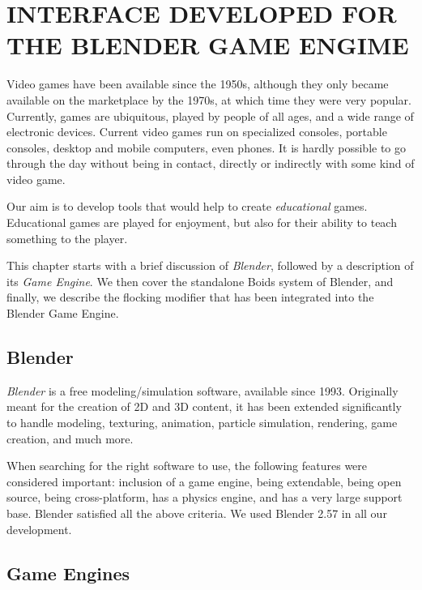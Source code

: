 \chapter{INTERFACE DEVELOPED FOR THE BLENDER GAME ENGIME}\label{chap5}


Video games have been available since the 1950s\cite{historyVideoGames}, although they only  became available on the marketplace by the 1970s, at which time they were very popular. Currently, games are ubiquitous, played by people of all ages, and a wide range of electronic devices. Current video games run on specialized consoles, portable consoles, desktop and mobile computers, even phones. It is hardly possible to go through the day without being in contact, directly or indirectly with some kind of video game.

Our aim is to develop tools that would help to create \textit{educational} games. Educational games are played for enjoyment, but also for their ability to teach something to the player. 

This chapter starts with a brief discussion of \textit{Blender}, followed by a description of its \textit{Game Engine}. We then cover the standalone Boids system of Blender, and finally, we describe the flocking modifier that has been integrated into the Blender Game Engine. 


\section{Blender}\label{blenderSec}
\textit{Blender}\cite{blenderWeb} is a free modeling/simulation software, available since 1993. Originally meant for the creation of 2D and 3D content, it has been extended significantly to handle modeling, texturing, animation, particle simulation, rendering, game creation, and much more. 

When searching for the right software to use, the following features were considered important: inclusion of a game engine, being extendable, being open source, being cross-platform, has a physics engine, and has a very large support base. Blender satisfied all the above criteria. We used Blender 2.57 in all our development. 

\section{Game Engines}

